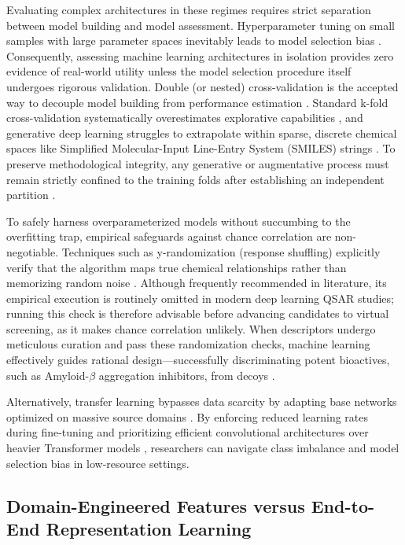 Evaluating complex architectures in these regimes requires strict separation between model building and model assessment. Hyperparameter tuning on small samples with large parameter spaces inevitably leads to model selection bias \cite{cawley2010}. Consequently, assessing machine learning architectures in isolation provides zero evidence of real-world utility unless the model selection procedure itself undergoes rigorous validation. Double (or nested) cross-validation is the accepted way to decouple model building from performance estimation \cite{bauman2014, cawley2010}. Standard k-fold cross-validation systematically overestimates explorative capabilities \cite{kyrali2022, xiong2020}, and generative deep learning struggles to extrapolate within sparse, discrete chemical spaces like Simplified Molecular-Input Line-Entry System (SMILES) strings \cite{yifan2023}. To preserve methodological integrity, any generative or augmentative process must remain strictly confined to the training folds after establishing an independent partition \cite{gerz2026, john2025}.

To safely harness overparameterized models \cite{winkler2026} without succumbing to the overfitting trap, empirical safeguards against chance correlation are non-negotiable. Techniques such as y-randomization (response shuffling) explicitly verify that the algorithm maps true chemical relationships rather than memorizing random noise \cite{rucker2007}. Although frequently recommended in literature, its empirical execution is routinely omitted in modern deep learning QSAR studies; running this check is therefore advisable before advancing candidates to virtual screening, as it makes chance correlation unlikely. When descriptors undergo meticulous curation and pass these randomization checks, machine learning effectively guides rational design—successfully discriminating potent bioactives, such as Amyloid-$\beta$ aggregation inhibitors, from decoys \cite{avantika2025}. 

Alternatively, transfer learning bypasses data scarcity by adapting base networks optimized on massive source domains \cite{samuel2023}. By enforcing reduced learning rates during fine-tuning \cite{damilola2025} and prioritizing efficient convolutional architectures over heavier Transformer models \cite{riza2025}, researchers can navigate class imbalance and model selection bias in low-resource settings.

\subsection{Domain-Engineered Features versus End-to-End Representation Learning}

